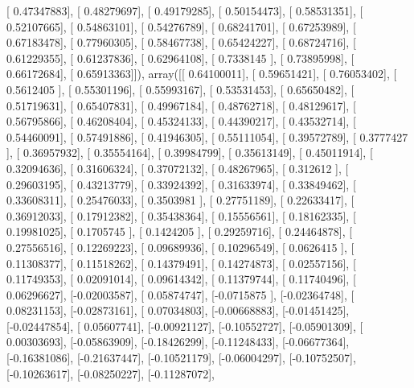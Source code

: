 \documentclass{article}
\begin{document}
       [ 0.47347883],
       [ 0.48279697],
       [ 0.49179285],
       [ 0.50154473],
       [ 0.58531351],
       [ 0.52107665],
       [ 0.54863101],
       [ 0.54276789],
       [ 0.68241701],
       [ 0.67253989],
       [ 0.67183478],
       [ 0.77960305],
       [ 0.58467738],
       [ 0.65424227],
       [ 0.68724716],
       [ 0.61229355],
       [ 0.61237836],
       [ 0.62964108],
       [ 0.7338145 ],
       [ 0.73895998],
       [ 0.66172684],
       [ 0.65913363]]), array([[ 0.64100011],
       [ 0.59651421],
       [ 0.76053402],
       [ 0.5612405 ],
       [ 0.55301196],
       [ 0.55993167],
       [ 0.53531453],
       [ 0.65650482],
       [ 0.51719631],
       [ 0.65407831],
       [ 0.49967184],
       [ 0.48762718],
       [ 0.48129617],
       [ 0.56795866],
       [ 0.46208404],
       [ 0.45324133],
       [ 0.44390217],
       [ 0.43532714],
       [ 0.54460091],
       [ 0.57491886],
       [ 0.41946305],
       [ 0.55111054],
       [ 0.39572789],
       [ 0.3777427 ],
       [ 0.36957932],
       [ 0.35554164],
       [ 0.39984799],
       [ 0.35613149],
       [ 0.45011914],
       [ 0.32094636],
       [ 0.31606324],
       [ 0.37072132],
       [ 0.48267965],
       [ 0.312612  ],
       [ 0.29603195],
       [ 0.43213779],
       [ 0.33924392],
       [ 0.31633974],
       [ 0.33849462],
       [ 0.33608311],
       [ 0.25476033],
       [ 0.3503981 ],
       [ 0.27751189],
       [ 0.22633417],
       [ 0.36912033],
       [ 0.17912382],
       [ 0.35438364],
       [ 0.15556561],
       [ 0.18162335],
       [ 0.19981025],
       [ 0.1705745 ],
       [ 0.1424205 ],
       [ 0.29259716],
       [ 0.24464878],
       [ 0.27556516],
       [ 0.12269223],
       [ 0.09689936],
       [ 0.10296549],
       [ 0.0626415 ],
       [ 0.11308377],
       [ 0.11518262],
       [ 0.14379491],
       [ 0.14274873],
       [ 0.02557156],
       [ 0.11749353],
       [ 0.02091014],
       [ 0.09614342],
       [ 0.11379744],
       [ 0.11740496],
       [ 0.06296627],
       [-0.02003587],
       [ 0.05874747],
       [-0.0715875 ],
       [-0.02364748],
       [ 0.08231153],
       [-0.02873161],
       [ 0.07034803],
       [-0.00668883],
       [-0.01451425],
       [-0.02447854],
       [ 0.05607741],
       [-0.00921127],
       [-0.10552727],
       [-0.05901309],
       [ 0.00303693],
       [-0.05863909],
       [-0.18426299],
       [-0.11248433],
       [-0.06677364],
       [-0.16381086],
       [-0.21637447],
       [-0.10521179],
       [-0.06004297],
       [-0.10752507],
       [-0.10263617],
       [-0.08250227],
       [-0.11287072],
\end{document}
